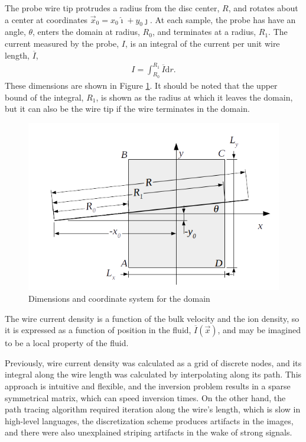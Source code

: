 \documentclass{article}
\def\I{\overline{I}}
\def\d{\mathrm{d}}
\def\x{\vec{x}}
\def\ui{\hat{\imath}}
\def\uj{\hat{\jmath}}
\begin{document}
The probe wire tip protrudes a radius from the disc center, $R$, and rotates about a center at coordinates $\vec{x}_0 = x_0\ui + y_0\uj$.  At each sample, the probe has have an angle, $\theta$, enters the domain at radius, $R_0$, and terminates at a radius, $R_1$.  The current measured by the probe, $I$, is an integral of the current per unit wire length, $\I$,
\begin{align}
I = \int_{R_0}^{R_1} \I \d r.
\end{align}
These dimensions are shown in Figure \ref{fig:coords}.  It should be noted that the upper bound of the integral, $R_1$, is shown as the radius at which it leaves the domain, but it can also be the wire tip if the wire terminates in the domain.
\begin{figure}
\centering
\includegraphics[width=.9\linewidth]{figures/coords}
\caption{Dimensions and coordinate system for the domain}\label{fig:coords}
\end{figure}

The wire current density is a function of the bulk velocity and the ion density, so it is expressed as a function of position in the fluid, $\I(\x)$, and may be imagined to be a local property of the fluid. 

Previously, wire current density was calculated as a grid of discrete nodes, and its integral along the wire length was calculated by interpolating along its path.  This approach is intuitive and flexible, and the inversion problem results in a sparse symmetrical matrix, which can speed inversion times.  On the other hand, the path tracing algorithm required iteration along the wire's length, which is slow in high-level languages, the discretization scheme produces artifacts in the images, and there were also unexplained striping artifacts in the wake of strong signals.
\end{document}
